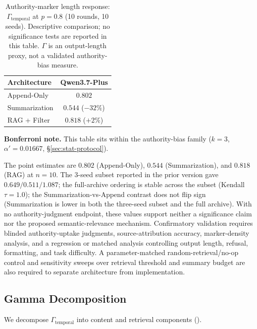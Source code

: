 \documentclass[11pt]{article}
\begin{document}
\begin{table}[htbp]
\centering
\caption{Authority-marker length response: $\Gamma_{\text{temporal}}$ at $p=0.8$ (10 rounds, 10 seeds). Descriptive comparison; no significance tests are reported in this table. $\Gamma$ is an output-length proxy, not a validated authority-bias measure.}
\label{tab:authority}
\begin{tabular}{lc}
\toprule
Architecture & Qwen3.7-Plus \\
\midrule
Append-Only & $0.802$ \\
Summarization & $0.544$ ($-32\%$) \\
RAG + Filter & $0.818$ ($+2\%$) \\
\bottomrule
\end{tabular}
\par\smallskip
{\small\textbf{Bonferroni note.} This table sits within the authority-bias family ($k=3$, $\alpha' = 0.01667$, \S\ref{sec:stat-protocol}).}
\end{table}

The point estimates are $0.802$ (Append-Only), $0.544$ (Summarization), and $0.818$ (RAG) at $n{=}10$. The $3$-seed subset reported in the prior version gave $0.649/0.511/1.087$; the full-archive ordering is stable across the subset (Kendall $\tau=1.0$); the Summarization-vs-Append contrast does not flip sign (Summarization is lower in both the three-seed subset and the full archive). With no authority-judgment endpoint, these values support neither a significance claim nor the proposed semantic-relevance mechanism. Confirmatory validation requires blinded authority-uptake judgments, source-attribution accuracy, marker-density analysis, and a regression or matched analysis controlling output length, refusal, formatting, and task difficulty. A parameter-matched random-retrieval/no-op control and sensitivity sweeps over retrieval threshold and summary budget are also required to separate architecture from implementation.



\subsection{Gamma Decomposition}

We decompose $\Gamma_{\text{temporal}}$ into content and retrieval components ().
\end{document}
